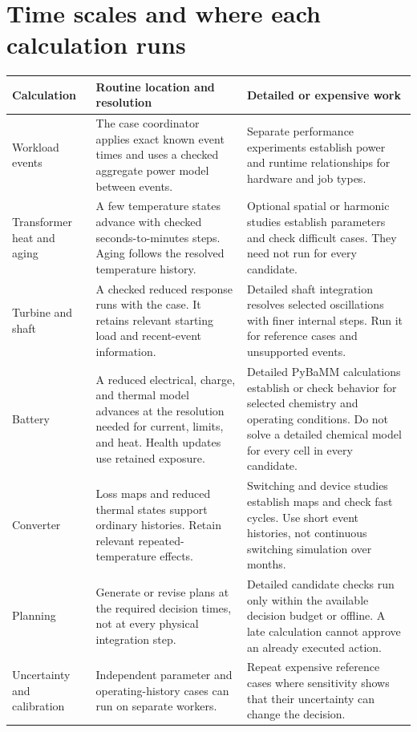\documentclass[11pt,a4paper]{report}
\begin{document}
\section{Time scales and where each calculation runs}
\begin{longtable}{L{0.18\textwidth}L{0.35\textwidth}L{0.35\textwidth}}
\toprule Calculation & Routine location and resolution & Detailed or expensive work \\ \midrule\endhead
Workload events & The case coordinator applies exact known event times and uses a checked aggregate power model between events. & Separate performance experiments establish power and runtime relationships for hardware and job types. \\
Transformer heat and aging & A few temperature states advance with checked seconds-to-minutes steps. Aging follows the resolved temperature history. & Optional spatial or harmonic studies establish parameters and check difficult cases. They need not run for every candidate. \\
Turbine and shaft & A checked reduced response runs with the case. It retains relevant starting load and recent-event information. & Detailed shaft integration resolves selected oscillations with finer internal steps. Run it for reference cases and unsupported events. \\
Battery & A reduced electrical, charge, and thermal model advances at the resolution needed for current, limits, and heat. Health updates use retained exposure. & Detailed PyBaMM calculations establish or check behavior for selected chemistry and operating conditions. Do not solve a detailed chemical model for every cell in every candidate. \\
Converter & Loss maps and reduced thermal states support ordinary histories. Retain relevant repeated-temperature effects. & Switching and device studies establish maps and check fast cycles. Use short event histories, not continuous switching simulation over months. \\
Planning & Generate or revise plans at the required decision times, not at every physical integration step. & Detailed candidate checks run only within the available decision budget or offline. A late calculation cannot approve an already executed action. \\
Uncertainty and calibration & Independent parameter and operating-history cases can run on separate workers. & Repeat expensive reference cases where sensitivity shows that their uncertainty can change the decision. \\
\bottomrule
\end{longtable}
\end{document}
